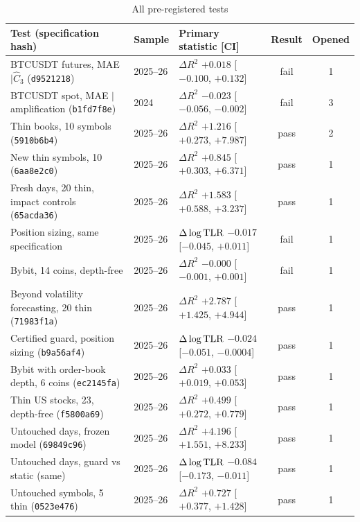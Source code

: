 \begin{table}[!htbp]\centering\footnotesize
\begin{threeparttable}
\caption{All pre-registered tests}\label{p2:tab:alltests}
\setlength{\tabcolsep}{3pt}
\begin{tabular}{p{}lp{}cc}
\toprule
Test (specification hash) & Sample & Primary statistic [CI] & Result & Opened\\
\midrule
BTCUSDT futures, MAE $\mid\hat C_3$ (\texttt{d9521218}) & 2025--26 & $\Delta R^2$ $+0.018$ [$-0.100$, $+0.132$] & fail & 1\\
BTCUSDT spot, MAE $\mid$ amplification (\texttt{b1fd7f8e}) & 2024 & $\Delta R^2$ $-0.023$ [$-0.056$, $-0.002$] & fail & 3\\
Thin books, 10 symbols (\texttt{5910b6b4}) & 2025--26 & $\Delta R^2$ $+1.216$ [$+0.273$, $+7.987$] & pass & 2\\
New thin symbols, 10 (\texttt{6aa8e2c0}) & 2025--26 & $\Delta R^2$ $+0.845$ [$+0.303$, $+6.371$] & pass & 1\\
Fresh days, 20 thin, impact controls (\texttt{65acda36}) & 2025--26 & $\Delta R^2$ $+1.583$ [$+0.588$, $+3.237$] & pass & 1\\
Position sizing, same specification & 2025--26 & $\Delta\log{\rm TLR}$ $-0.017$ [$-0.045$, $+0.011$] & fail & 1\\
Bybit, 14 coins, depth-free & 2025--26 & $\Delta R^2$ $-0.000$ [$-0.001$, $+0.001$] & fail & 1\\
Beyond volatility forecasting, 20 thin (\texttt{71983f1a}) & 2025--26 & $\Delta R^2$ $+2.787$ [$+1.425$, $+4.944$] & pass & 1\\
Certified guard, position sizing (\texttt{b9a56af4}) & 2025--26 & $\Delta\log{\rm TLR}$ $-0.024$ [$-0.051$, $-0.0004$] & pass & 1\\
Bybit with order-book depth, 6 coins (\texttt{ec2145fa}) & 2025--26 & $\Delta R^2$ $+0.033$ [$+0.019$, $+0.053$] & pass & 1\\
Thin US stocks, 23, depth-free (\texttt{f5800a69}) & 2025--26 & $\Delta R^2$ $+0.499$ [$+0.272$, $+0.779$] & pass & 1\\
Untouched days, frozen model (\texttt{69849c96}) & 2025--26 & $\Delta R^2$ $+4.196$ [$+1.551$, $+8.233$] & pass & 1\\
Untouched days, guard vs static (same) & 2025--26 & $\Delta\log{\rm TLR}$ $-0.084$ [$-0.173$, $-0.011$] & pass & 1\\
Untouched symbols, 5 thin (\texttt{0523e476}) & 2025--26 & $\Delta R^2$ $+0.727$ [$+0.377$, $+1.428$] & pass & 1\\

\end{tabular}
\end{threeparttable}
\end{table}
